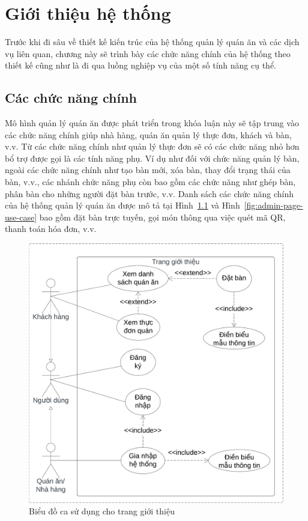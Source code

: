 \chapter{Giới thiệu hệ thống}\label{chap1}
Trước khi đi sâu về thiết kế kiến trúc của hệ thống quản lý quán ăn và các dịch vụ liên quan, chương này sẽ trình bày các chức năng chính của hệ thống theo thiết kế cũng như là đi qua luồng nghiệp vụ của một số tính năng cụ thể.
\section*{Các chức năng chính}\label{sec:main-functions}
Mô hình quản lý quán ăn được phát triển trong khóa luận này sẽ tập trung vào các chức năng chính giúp nhà hàng, quán ăn quản lý thực đơn, khách và bàn, v.v.
Từ các chức năng chính như quản lý thực đơn sẽ có các chức năng nhỏ hơn bổ trợ được gọi là các tính năng phụ.
Ví dụ như đối với chức năng quản lý bàn, ngoài các chức năng chính như tạo bàn mới, xóa bàn, thay đổi trạng thái của bàn, v.v., các nhánh chức năng phụ còn bao gồm các chức năng như ghép bàn, phân bàn cho những người đặt bàn trước, v.v.
Danh sách các chức năng chính của hệ thống quản lý quán ăn được mô tả tại Hình~\ref{fig:landing-page-use-case} và Hình~\ref{fig:admin-page-use-case} bao gồm đặt bàn trực tuyến, gọi món thông qua việc quét mã QR, thanh toán hóa đơn, v.v.

\begin{figure}[H]
	\centering
	\includegraphics[width=\textwidth]{images/hChip/main-flow/landing-page-use-case-diagram.png}
	\caption{Biểu đồ ca sử dụng cho trang giới thiệu }
	\label{fig:landing-page-use-case}
\end{figure}

